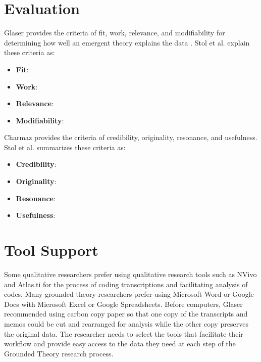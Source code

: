 \section{Evaluation}
Glaser provides the criteria of fit, work, relevance, and modifiability for determining how well an emergent theory explains the data \cite{GlaserTheoreticalSensitivity}. Stol et al.  \cite{StolGroundedTheory} explain these criteria as:
\begin{itemize}
\item \textbf{Fit}:  
\item \textbf{Work}:   
\item\textbf{Relevance}:  
\item \textbf{Modifiability}:  
\end{itemize}

Charmaz provides the criteria of credibility, originality, resonance, and usefulness. Stol et al.  \cite{StolGroundedTheory} summarizes these criteria as:
\begin{itemize}
\item \textbf{Credibility}:  
\item \textbf{Originality}:   
\item\textbf{Resonance}:  
\item \textbf{Usefulness}:  
\end{itemize}

\section{Tool Support}
Some qualitative researchers prefer using qualitative research tools such as NVivo and Atlas.ti for the process of coding transcriptions and facilitating analysis of codes. Many grounded theory researchers prefer using Microsoft Word or Google Docs with Microsoft Excel or Google Spreadsheets. Before computers, Glaser recommended using carbon copy paper so that one copy of the transcripts and memos could be cut and rearranged for analysis while the other copy preserves the original data. The researcher needs to select the tools that facilitate their workflow and provide easy access to the data they need at each step of the Grounded Theory research process.

